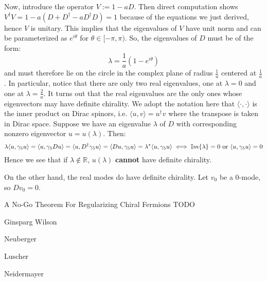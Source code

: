 \documentclass[11pt, oneside]{article}   	%
\theoremstyle{definition}
\begin{document}
Now, introduce the operator $V := 1 - a D$. Then direct computation shows $V^\dagger V = 1 - a(D + D^\dagger - a D^\dagger D) = 1$ 
because of the equations we just derived, hence $V$ is unitary. This implies that the eigenvalues of $V$ have unit norm and can be 
parameterized as $e^{i\theta}$ for $\theta\in [-\pi, \pi)$. So, the eigenvalues of $D$ must be of the form:
\begin{equation}
	\lambda = \frac{1}{a}\left(1 - e^{i\theta}\right)
\end{equation}
and must therefore lie on the circle in the complex plane of radius $\frac{1}{a}$ centered at $\frac{1}{a}$. In particular, notice that there 
are only two real eigenvalues, one at $\lambda = 0$ and one at $\lambda = \frac{2}{a}$. It turns out that the real eigenvalues are the 
only ones whose eigenvectors may have definite chirality. We adopt the notation here that $\langle\cdot, \cdot\rangle$ is the inner 
product on Dirac spinors, i.e. $\langle u, v\rangle = u^\dagger v$ where the transpose is taken in Dirac space. Suppose we have an eigenvalue 
$\lambda$ of $D$ with corresponding nonzero eigenvector $u = u(\lambda)$. Then:
\begin{equation}
	\lambda\langle u, \gamma_5 u\rangle = \langle u, \gamma_5 Du\rangle = \langle u, D^\dagger\gamma_5 u\rangle = \langle Du, \gamma_5 u\rangle = \lambda^*
	\langle u, \gamma_5 u\rangle\iff \mathbb{I}m\{\lambda\} = 0\textnormal{ or } \langle u, \gamma_5 u\rangle = 0
\end{equation}
Hence we see that if $\lambda\notin\mathbb R$, $u(\lambda)$ \textbf{cannot} have definite chirality. 


On the other hand, the real modes do have definite chirality. Let $v_0$ be a 0-mode, so $Dv_0 = 0$. 


\newpage
\begin{thebibliography}{99}

	A No-Go Theorem For Regularizing Chiral Fermions TODO
	
	Ginsparg Wilson
	
	Neuberger
	
	Luscher
	
	Neidermayer

\end{thebibliography}
\end{document}
